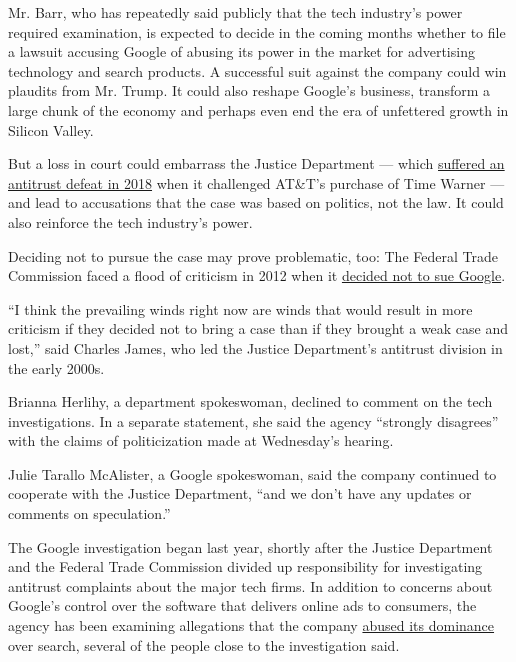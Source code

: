 Mr. Barr, who has repeatedly said publicly that the tech industry's
power required examination, is expected to decide in the coming months
whether to file a lawsuit accusing Google of abusing its power in the
market for advertising technology and search products. A successful suit
against the company could win plaudits from Mr. Trump. It could also
reshape Google's business, transform a large chunk of the economy and
perhaps even end the era of unfettered growth in Silicon Valley.

But a loss in court could embarrass the Justice Department --- which
\href{https://www.nytimes3xbfgragh.onion/2018/06/12/business/dealbook/att-time-warner-ruling-antitrust-case.html}{suffered
an antitrust defeat in 2018} when it challenged AT\&T's purchase of Time
Warner --- and lead to accusations that the case was based on politics,
not the law. It could also reinforce the tech industry's power.

Deciding not to pursue the case may prove problematic, too: The Federal
Trade Commission faced a flood of criticism in 2012 when it
\href{https://www.nytimes3xbfgragh.onion/2013/01/04/technology/google-agrees-to-changes-in-search-ending-us-antitrust-inquiry.html}{decided
not to sue Google}.

``I think the prevailing winds right now are winds that would result in
more criticism if they decided not to bring a case than if they brought
a weak case and lost,'' said Charles James, who led the Justice
Department's antitrust division in the early 2000s.

Brianna Herlihy, a department spokeswoman, declined to comment on the
tech investigations. In a separate statement, she said the agency
``strongly disagrees'' with the claims of politicization made at
Wednesday's hearing.

Julie Tarallo McAlister, a Google spokeswoman, said the company
continued to cooperate with the Justice Department, ``and we don't have
any updates or comments on speculation.''

The Google investigation began last year, shortly after the Justice
Department and the Federal Trade Commission divided up responsibility
for investigating antitrust complaints about the major tech firms. In
addition to concerns about Google's control over the software that
delivers online ads to consumers, the agency has been examining
allegations that the company
\href{https://www.nytimes3xbfgragh.onion/2020/06/04/technology/google-european-search-menu-antitrust.html}{abused
its dominance} over search, several of the people close to the
investigation said.

